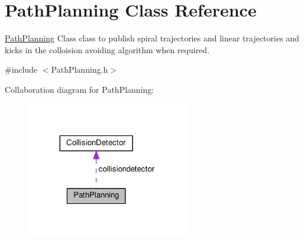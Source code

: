 \hypertarget{classPathPlanning}{}\section{Path\+Planning Class Reference}
\label{classPathPlanning}


\hyperlink{classPathPlanning}{Path\+Planning} Class class to publish spiral trajectories and linear trajectories and kicks in the colloision avoiding algorithm when required.  




{\ttfamily \#include $<$Path\+Planning.\+h$>$}



Collaboration diagram for Path\+Planning\+:\nopagebreak
\begin{figure}[H]
\begin{center}
\leavevmode
\includegraphics[width=200pt]{classPathPlanning__coll__graph}
\end{center}
\end{figure}
